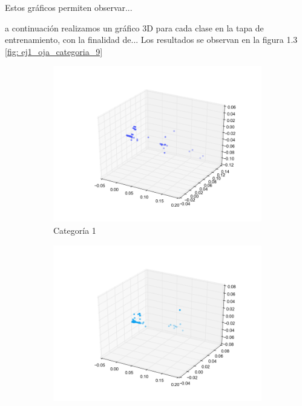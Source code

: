 \par Estos gráficos permiten observar...


\par a continuación realizamos un gráfico 3D para cada clase en la tapa de entrenamiento, con la finalidad de... Los resultados se observan en la figura 1.3 \ref{fig: ej1_oja_categoria_9}

\begin{figure}[H]
        \begin{subfigure}[b]{0.33\textwidth}
                \includegraphics[width=\linewidth]{secciones/graficos/oja/categoria_1.png}
                \caption{Categoría 1}
                \label{fig: ej1_oja_categoria_1}
        \end{subfigure}
        \begin{subfigure}[b]{0.33\textwidth}
                \includegraphics[width=\linewidth]{secciones/graficos/oja/categoria_2.png}

\end{subfigure}
\end{figure}
